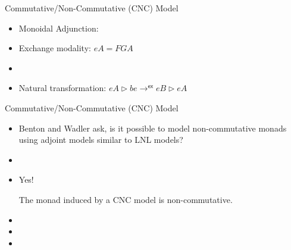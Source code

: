 \documentclass{beamer}
\let\mto\to
\let\to\relax
\begin{document}


\begin{frame}{Commutative/Non-Commutative (CNC) Model}

  \begin{itemize}
  \item Monoidal Adjunction:
    \begin{center}
    \end{center}
    
  \item Exchange modality: $eA = FGA$
  \item[]
  \item Natural transformation: $eA \rhd be \mto^{\mathsf{ex}} eB \rhd eA$
  \end{itemize}

\end{frame}

\begin{frame}{Commutative/Non-Commutative (CNC) Model}

  \begin{itemize}
  \item Benton and Wadler ask, is it possible to model non-commutative
    monads using adjoint models similar to LNL models?
  \item[]
  \item Yes!
    \begin{lemma}
      \label{lemma:non-com-CNC}
      The monad induced by a CNC model is non-commutative.
    \end{lemma}
  \item[]
  \item[]
  \item[]
  \end{itemize}  
\end{frame}
\end{document}

